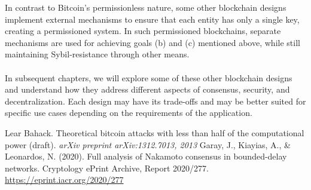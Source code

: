 \documentclass{report}
\begin{document}
In contrast to Bitcoin's permissionless nature, some other blockchain designs implement external mechanisms to ensure that each entity has only a single key, creating a permissioned system. In such permissioned blockchains, separate mechanisms are used for achieving goals (b) and (c) mentioned above, while still maintaining Sybil-resistance through other means.\\\\
In subsequent chapters, we will explore some of these other blockchain designs and understand how they address different aspects of consensus, security, and decentralization. Each design may have its trade-offs and may be better suited for specific use cases depending on the requirements of the application.

\renewcommand{\bibname}{References}
\begin{thebibliography}{9}
	 Lear Bahack. Theoretical bitcoin attacks with less than half of the computational power (draft). \textit{arXiv preprint arXiv:1312.7013, 2013}
	 Garay, J., Kiayias, A., \& Leonardos, N. (2020). Full analysis of Nakamoto consensus in bounded-delay networks. Cryptology ePrint Archive, Report 2020/277. \url{https://eprint.iacr.org/2020/277}
\end{thebibliography}
\end{document}

